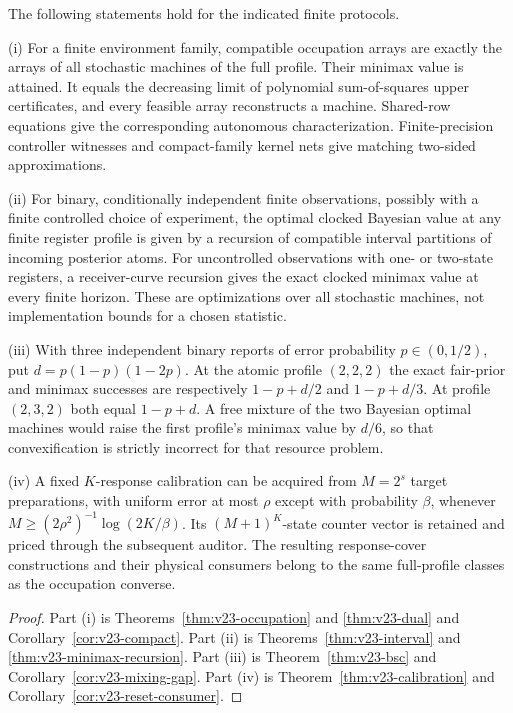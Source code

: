 \begin{theorem}
\label{thm:v23-main}
The following statements hold for the indicated finite protocols.

\smallskip\noindent
\textup{(i)} For a finite environment family, compatible occupation
arrays are exactly the arrays of all stochastic machines of the full
profile. Their minimax value is attained. It equals the decreasing
limit of polynomial sum-of-squares upper certificates, and every
feasible array reconstructs a machine. Shared-row equations give the
corresponding autonomous characterization. Finite-precision controller
witnesses and compact-family kernel nets give matching two-sided
approximations.

\smallskip\noindent
\textup{(ii)} For binary, conditionally independent finite observations,
possibly with a finite controlled choice of experiment, the optimal
clocked Bayesian value at any finite register profile is given by a
recursion of compatible interval partitions of incoming posterior
atoms. For uncontrolled observations with one- or two-state registers,
a receiver-curve recursion gives the exact clocked minimax value at
every finite horizon. These are optimizations over all stochastic
machines, not implementation bounds for a chosen statistic.

\smallskip\noindent
\textup{(iii)} With three independent binary reports of error probability
$p\in(0,1/2)$, put $d=p(1-p)(1-2p)$. At the atomic profile $(2,2,2)$
the exact fair-prior and minimax successes are respectively
$1-p+d/2$ and $1-p+d/3$. At profile $(2,3,2)$ both equal $1-p+d$.
A free mixture of the two Bayesian optimal machines would raise the
first profile's minimax value by $d/6$, so that convexification is
strictly incorrect for that resource problem.

\smallskip\noindent
\textup{(iv)} A fixed $K$-response calibration can be acquired from
$M=2^s$ target preparations, with uniform error at most $\rho$ except
with probability $\beta$, whenever
$M\ge(2\rho^2)^{-1}\log(2K/\beta)$. Its $(M+1)^K$-state counter
vector is retained and priced through the subsequent auditor. The
resulting response-cover constructions and their physical consumers
belong to the same full-profile classes as the occupation converse.
\end{theorem}
\begin{proof}
Part (i) is Theorems~\ref{thm:v23-occupation} and
\ref{thm:v23-dual} and Corollary~\ref{cor:v23-compact}. Part (ii) is
Theorems~\ref{thm:v23-interval} and \ref{thm:v23-minimax-recursion}.
Part (iii) is Theorem~\ref{thm:v23-bsc} and
Corollary~\ref{cor:v23-mixing-gap}. Part (iv) is
Theorem~\ref{thm:v23-calibration} and
Corollary~\ref{cor:v23-reset-consumer}.
\end{proof}

